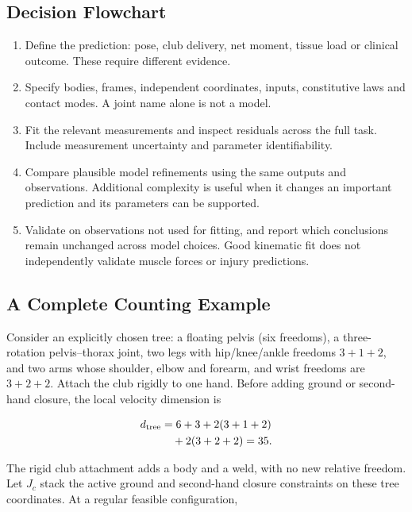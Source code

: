 \subsection{Decision Flowchart}\label{decision-flowchart}

\begin{enumerate}
\def\labelenumi{\arabic{enumi}.}

\item
  Define the prediction: pose, club delivery, net moment, tissue load or clinical outcome. These require different evidence.
\item
  Specify bodies, frames, independent coordinates, inputs, constitutive laws and contact modes. A joint name alone is not a model.
\item
  Fit the relevant measurements and inspect residuals across the full task. Include measurement uncertainty and parameter identifiability.
\item
  Compare plausible model refinements using the same outputs and observations. Additional complexity is useful when it changes an important prediction and its parameters can be supported.
\item
  Validate on observations not used for fitting, and report which conclusions remain unchanged across model choices. Good kinematic fit does not independently validate muscle forces or injury predictions.
\end{enumerate}

\subsection{A Complete Counting Example}\label{a-complete-counting-example}

Consider an explicitly chosen tree: a floating pelvis (six freedoms), a three-rotation pelvis--thorax joint, two legs with hip/knee/ankle freedoms \(3+1+2\), and two arms whose shoulder, elbow and forearm, and wrist freedoms are \(3+2+2\). Attach the club rigidly to one hand. Before adding ground or second-hand closure, the local velocity dimension is

\[
\begin{aligned}d_{\rm tree}&=6+3+2(3+1+2)\\ &\quad+2(3+2+2)=35.\end{aligned}
\]

The rigid club attachment adds a body and a weld, with no new relative freedom. Let \(J_c\) stack the active ground and second-hand closure constraints on these tree coordinates. At a regular feasible configuration,

